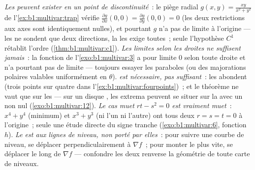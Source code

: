 \begin{remark}
\label{rem:b1:multivar:pitfalls}
\emph{Les  peuvent exister en un point de
discontinuité}~: le piège radial $g(x,y) = \frac{xy}{x^2+y^2}$ de
l'\cref{ex:b1:multivar:trap} vérifie $\frac{\partial g}{\partial
x}(0,0) = \frac{\partial g}{\partial y}(0,0) = 0$ (les deux
restrictions aux axes sont identiquement nulles), et pourtant $g$
n'a pas de limite à l'origine --- les  ne
sondent que deux directions, la  les exige toutes~;
seule l'hypothèse $C^1$ rétablit l'ordre
(\cref{thm:b1:multivar:c1}).
\emph{Les limites selon les droites ne suffisent jamais}~: la
fonction de l'\cref{exo:b1:multivar:3} a pour limite $0$ selon toute
droite et n'a pourtant pas de limite --- toujours essayer les
paraboles (ou des majorations polaires valables uniformément en
$\theta$).
\emph{ est nécessaire, pas suffisant}~: les 
abondent (trois points sur quatre dans
l'\cref{ex:b1:multivar:fourpoints})~; et le théorème ne vaut que sur
les \emph{} --- sur un disque , les extrema peuvent se
situer sur la  avec un  non nul
(\cref{exo:b1:multivar:12}).
\emph{Le cas muet $rt - s^2 = 0$ est vraiment muet}~: $x^4
+ y^4$ (minimum) et $x^3 + y^3$ (ni l'un ni l'autre) ont tous deux
$r = s = t = 0$ à l'origine~; seule une étude directe du signe
tranche (\cref{exo:b1:multivar:6}, fonction $h$).
\emph{Le  est  aux lignes de niveau, non porté
par elles}~: pour suivre une courbe de niveau, se déplacer
perpendiculairement à $\nabla f$~; pour monter le plus vite, se
déplacer le long de $\nabla f$ --- confondre les deux renverse la
géométrie de toute carte de niveaux.
\end{remark}

